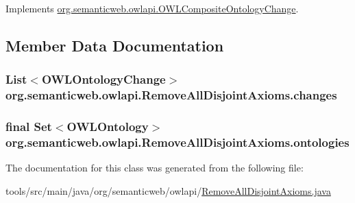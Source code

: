 Implements \hyperlink{interfaceorg_1_1semanticweb_1_1owlapi_1_1_o_w_l_composite_ontology_change_a047d3f540ac840c0ac0285bc576636d2}{org.\-semanticweb.\-owlapi.\-O\-W\-L\-Composite\-Ontology\-Change}.



\subsection{Member Data Documentation}
\hypertarget{classorg_1_1semanticweb_1_1owlapi_1_1_remove_all_disjoint_axioms_a1cc57433f7b8f3ef189a54a7ceec4287}{
\subsubsection[{changes}]{\setlength{\rightskip}{0pt plus 5cm}List$<${\bf O\-W\-L\-Ontology\-Change}$>$ org.\-semanticweb.\-owlapi.\-Remove\-All\-Disjoint\-Axioms.\-changes\hspace{0.3cm}{\ttfamily [private]}}}\label{classorg_1_1semanticweb_1_1owlapi_1_1_remove_all_disjoint_axioms_a1cc57433f7b8f3ef189a54a7ceec4287}
\hypertarget{classorg_1_1semanticweb_1_1owlapi_1_1_remove_all_disjoint_axioms_aaf533ab6481535266cfea2c0c22410c9}{
\subsubsection[{ontologies}]{\setlength{\rightskip}{0pt plus 5cm}final Set$<${\bf O\-W\-L\-Ontology}$>$ org.\-semanticweb.\-owlapi.\-Remove\-All\-Disjoint\-Axioms.\-ontologies\hspace{0.3cm}{\ttfamily [private]}}}\label{classorg_1_1semanticweb_1_1owlapi_1_1_remove_all_disjoint_axioms_aaf533ab6481535266cfea2c0c22410c9}


The documentation for this class was generated from the following file\-:\begin{DoxyCompactItemize}
\item 
tools/src/main/java/org/semanticweb/owlapi/\hyperlink{_remove_all_disjoint_axioms_8java}{Remove\-All\-Disjoint\-Axioms.\-java}\end{DoxyCompactItemize}
